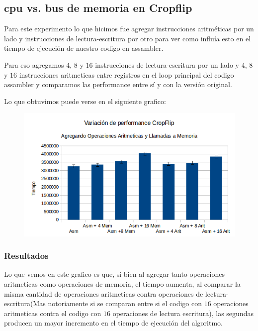 \documentclass[a4paper]{article}
\begin{document}
\newpage

\subsection{cpu vs. bus de memoria en Cropflip}

Para este experimento lo que hicimos fue agregar instrucciones aritméticas por un lado y instrucciones de lectura-escritura por otro para ver como influía esto en el tiempo de ejecución de nuestro codigo en assambler.

Para eso agregamos $4$, $8$ y $16$ instrucciones de lectura-escritura por un lado y $4$, $8$ y $16$ instrucciones aritmeticas entre registros en el loop principal del codigo assambler y comparamos las performance entre sí y con la versión original.

Lo que obtuvimos puede verse en el siguiente grafico:

\begin{figure}[h!]
  \begin{center}
  \includegraphics[scale=0.66]{Graficos1.5/crop/per.png}
  \label{nombreparareferenciar1}
  \end{center}
\end{figure}

\subsubsection{Resultados}
Lo que vemos en este grafico es que, si bien al agregar tanto operaciones aritmeticas como operaciones de memoria, el tiempo aumenta, al comparar la misma cantidad de operaciones aritmeticas contra operaciones de lectura-escritura(Mas notoriamente si se comparan entre si el codigo con $16$ operaciones aritmeticas contra el codigo con $16$ operaciones de lectura escritura), las segundas producen un mayor incremento en el tiempo de ejecución del algoritmo.
\end{document}
